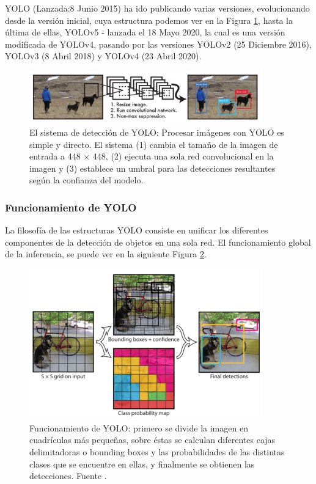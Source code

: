    YOLO \cite{yolo} (Lanzada:8 Junio 2015) ha ido publicando varias versiones, evolucionando desde la versión inicial, cuya estructura podemos ver en la Figura \ref{fig:yolo sistema}, hasta la última de ellas, YOLOv5 \cite{yolov5} - \cite{yolov5} lanzada el 18 Mayo 2020, la cual es una versión modificada de YOLOv4, pasando por las versiones YOLOv2 \cite{yolov2} (25 Diciembre 2016), YOLOv3 \cite{yolov3} (8 Abril 2018) y YOLOv4 \cite{yolov4} (23 Abril 2020).
   
   
\begin{figure}
    \centering
    \includegraphics[width=0.9\textwidth]{img/Yolo1sistema.png}
    \caption{El sistema de detección de YOLO: Procesar imágenes con YOLO es simple y directo. El sistema (1) cambia el tamaño de la imagen de entrada a 448 × 448, (2) ejecuta una sola red convolucional en la imagen y (3) establece un umbral para las detecciones resultantes según la confianza del modelo. \cite{yolo}}
    \label{fig:yolo sistema}
\end{figure}
   
   
\subsubsection{Funcionamiento de YOLO}

La filosofía de las estructuras YOLO consiste en unificar los diferentes componentes de la detección de objetos en una sola red. El funcionamiento global de la inferencia, se puede ver en la siguiente Figura \ref{fig:yolo funcionamiento}.

\begin{figure}
    \centering
    \includegraphics[width=0.9\textwidth]{img/YoloModel.png}
    \caption{Funcionamiento de YOLO: primero se divide la imagen en cuadrículas más pequeñas, sobre éstas se calculan diferentes cajas delimitadoras o bounding boxes y las probabilidades de las distintas clases que se encuentre en ellas, y finalmente se obtienen las detecciones. Fuente \cite{yolo}. }
    \label{fig:yolo funcionamiento}
\end{figure}

